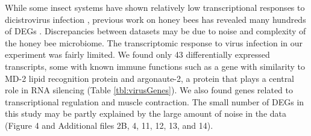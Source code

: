 \documentclass{bmcart}
\begin{document}
\begin{linenumbers}
\begin{doublespacing}
While some insect systems have shown relatively low transcriptional responses to dicistrovirus infection \cite{fewDEGs, fewDEGs2}, previous work on honey bees has revealed many hundreds of DEGs \cite{galbraith}. Discrepancies between datasets may be due to noise and complexity of the honey bee microbiome. The transcriptomic response to virus infection in our experiment was fairly limited. We found only 43 differentially expressed transcripts, some with known immune functions such as a gene with similarity to MD-2 lipid recognition protein and argonaute-2, a protein that plays a central role in RNA silencing (Table \ref{tbl:virusGenes}). We also found genes related to transcriptional regulation and muscle contraction. The small number of DEGs in this study may be partly explained by the large amount of noise in the data (Figure 4 and Additional files 2B, 4, 11, 12, 13, and 14).


\end{doublespacing}
\end{linenumbers}
\end{document}
